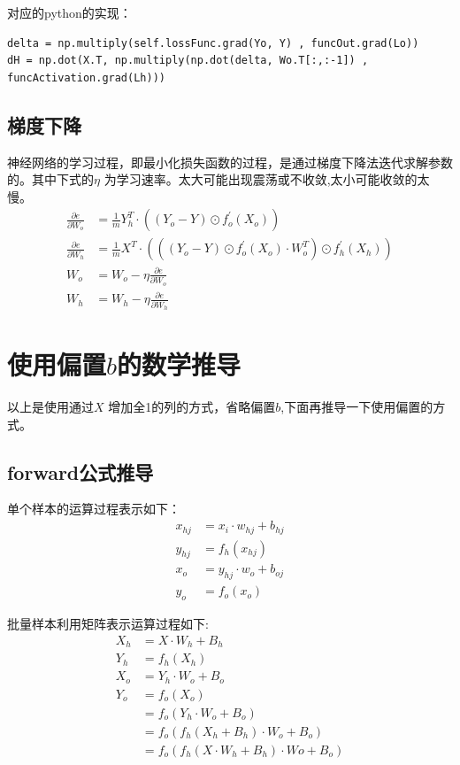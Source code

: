 \documentclass[12pt, a4paper, oneside]{ctexart}
\begin{document}
对应的python的实现：
\begin{lstlisting}
delta = np.multiply(self.lossFunc.grad(Yo, Y) , funcOut.grad(Lo))
dH = np.dot(X.T, np.multiply(np.dot(delta, Wo.T[:,:-1]) , funcActivation.grad(Lh)))
\end{lstlisting}
\subsection{梯度下降}
神经网络的学习过程，即最小化损失函数的过程，是通过梯度下降法迭代求解参数的。其中下式的$\eta$
为学习速率。太大可能出现震荡或不收敛,太小可能收敛的太慢。
\begin{align}    
    \frac{\partial e}{\partial W_o} &= \frac{1}{m}Y_h^T \cdot ((Y_o - Y) \odot f_o^{'}(X_o))    \nonumber \\
    \frac{\partial e}{\partial W_h} &= \frac{1}{m}X^T \cdot (((Y_o - Y) \odot f_o^{'}(X_o) \cdot W_o^T) \odot f_h^{'}(X_h))  \nonumber \\
    W_o &= W_o - \eta\frac{\partial e}{\partial W_o} \nonumber \\
    W_h &= W_h - \eta\frac{\partial e}{\partial W_h} \nonumber
\end{align}

\newpage
\section{使用偏置$b$的数学推导}
以上是使用通过$X$ 增加全1的列的方式，省略偏置$b$,下面再推导一下使用偏置的方式。
\subsection{forward公式推导}
单个样本的运算过程表示如下：
\begin{align}    
    x_{hj} &= x_i \cdot w_{hj} + b_{hj} \nonumber\\
    y_{hj} &= f_h(x_{hj})               \nonumber\\
    x_o &= y_{hj} \cdot w_{o} + b_{oj}  \nonumber\\
    y_{o} &= f_o(x_o)                   \nonumber
\end{align}

批量样本利用矩阵表示运算过程如下:
\begin{align}
	X_h  &= X \cdot W_h + B_h 						\nonumber\\
	Y_h  &= f_h(X_h) 								\nonumber\\
	X_o  &= Y_h \cdot W_o + B_o						\nonumber\\
    Y_o  &= f_o(X_o) 								\nonumber\\
    	 &= f_o(Y_h \cdot W_o + B_o) 				\nonumber\\
    	 &= f_o(f_h(X_h + B_h) \cdot W_o + B_o) 	\nonumber\\
         &= f_o(f_h(X \cdot W_h+ B_h) \cdot Wo + B_o) \label{eq12}
\end{align}
\end{document}
